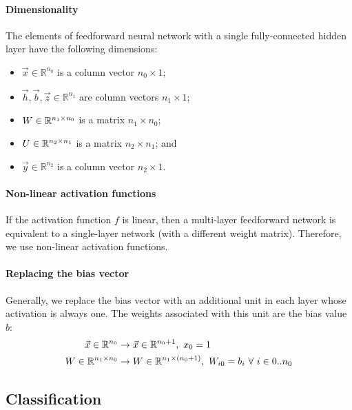 \paragraph{Dimensionality}

The elements of feedforward neural network with a single fully-connected hidden
layer have the following dimensions:
\begin{itemize}
  \item $\vec{x} \in \mathbb{R}^{n_0}$ is a column vector $n_0 \times 1$;
  \item $\vec{h}, \vec{b}, \vec{z} \in \mathbb{R}^{n_1}$ are column vectors $n_1 \times 1$;
  \item $W \in \mathbb{R}^{n_1 \times n_0}$ is a matrix $n_1 \times n_0$;
  \item $U \in \mathbb{R}^{n_2 \times n_1}$ is a matrix $n_2 \times n_1$; and
  \item $\vec{y} \in \mathbb{R}^{n_2}$ is a column vector $n_2 \times 1$.
\end{itemize}

\paragraph{Non-linear activation functions}

If the activation function $f$ is linear, then a multi-layer feedforward network
is equivalent to a single-layer network (with a different weight matrix).
Therefore, we use non-linear activation functions.

\paragraph{Replacing the bias vector}

Generally, we replace the bias vector with an additional unit in each layer
whose activation is always one.
The weights associated with this unit are the bias value $b$:
\begin{align*}
  \vec{x} \in \mathbb{R}^{n_0}
   & \rightarrow \vec{x} \in \mathbb{R}^{n_0 + 1},\
  x_0 = 1                                                         \\
  W \in \mathbb{R}^{n_1 \times n_0}
   & \rightarrow W \in \mathbb{R}^{n_1 \times (n_0 + 1)},\
  W_{i0} = b_i \ \forall\ i \in 0 .. n_0                          \\
\end{align*}

\subsection{Classification}

